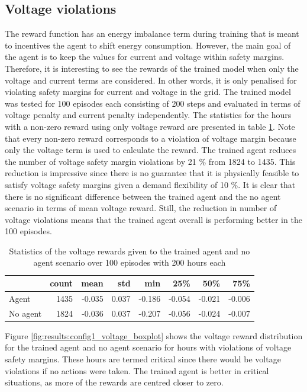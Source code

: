 \documentclass[class=book, crop=false]{standalone}
\begin{document}
\subsection{Voltage violations}
The reward function has an energy imbalance term during training that is meant to incentives the agent to shift energy consumption. However, the main goal of the agent is to keep the values for current and voltage within safety margins. Therefore, it is interesting to see the rewards of the trained model when only the voltage and current terms are considered. In other words, it is only penalised for violating safety margins for current and voltage in the grid. The trained model was tested for 100 episodes each consisting of 200 steps and evaluated
in terms of voltage penalty and current penalty independently. The statistics for the hours with a non-zero reward using only voltage reward are presented in table \ref{table:results:configuration1_reward_100_episodes}. Note that every non-zero reward corresponds to a violation of voltage margin because only the voltage term is used to calculate the reward. The trained agent reduces the number of voltage safety margin violations by 21 \% from 1824 to 1435. This reduction is impressive since there is no guarantee that it is physically feasible to satisfy voltage safety margins given a demand flexibility of 10 \%. It is clear that there is no significant difference between the trained agent and the no agent scenario in terms of mean voltage reward. Still, the reduction in number of voltage violations means that the trained agent overall is performing better in the 100 episodes. 
\begin{table}[h]
\center
\begin{tabular}{l|rrrrrrr}
         & count & mean   & std   & min    & 25\%   & 50\%   & 75\%   \\
\hline
Agent    & 1435  & -0.035 & 0.037 & -0.186 & -0.054 & -0.021 & -0.006 \\
No agent & 1824  & -0.036 & 0.037 & -0.207 & -0.056 & -0.024 & -0.007 \\
\hline
\end{tabular}
\caption{Statistics of the voltage rewards given to the trained agent and no agent scenario over 100 episodes with 200 hours each}
\label{table:results:configuration1_reward_100_episodes}
\end{table}

Figure \ref{fig:results:config1_voltage_boxplot} shows the voltage reward distribution for the trained agent and no agent scenario for hours with violations of voltage safety margins. These hours are termed critical since there would be voltage violations if no actions were taken. The trained agent is better in critical situations, as more of the rewards are centred closer to zero.
\end{document}
